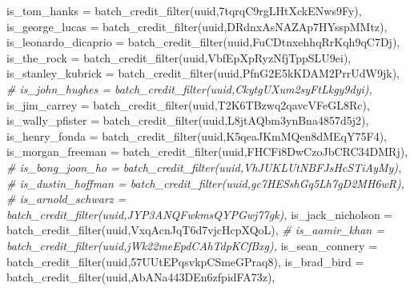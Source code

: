 \documentclass[
]{article}
\newenvironment{Shaded}{\begin{snugshade}}{\end{snugshade}}
\newcommand{\AttributeTok}[1]{\textcolor[rgb]{0.77,0.63,0.00}{#1}}
\newcommand{\CommentTok}[1]{\textcolor[rgb]{0.56,0.35,0.01}{\textit{#1}}}
\newcommand{\FunctionTok}[1]{\textcolor[rgb]{0.00,0.00,0.00}{#1}}
\newcommand{\NormalTok}[1]{#1}
\newcommand{\StringTok}[1]{\textcolor[rgb]{0.31,0.60,0.02}{#1}}
\begin{document}
\begin{Shaded}
\begin{Highlighting}[]
    \AttributeTok{is\_tom\_hanks =} \FunctionTok{batch\_credit\_filter}\NormalTok{(uuid,}\StringTok{\textquotesingle{}7tqrqC9rgLHtXckENws9Fy\textquotesingle{}}\NormalTok{),}
    \AttributeTok{is\_george\_lucas =} \FunctionTok{batch\_credit\_filter}\NormalTok{(uuid,}\StringTok{\textquotesingle{}DRdnxAsNAZAp7HYsspMMtz\textquotesingle{}}\NormalTok{),}
    \AttributeTok{is\_leonardo\_dicaprio =} \FunctionTok{batch\_credit\_filter}\NormalTok{(uuid,}\StringTok{\textquotesingle{}FuCDtnxehhqRrKqh9qC7Dj\textquotesingle{}}\NormalTok{),}
    \AttributeTok{is\_the\_rock =} \FunctionTok{batch\_credit\_filter}\NormalTok{(uuid,}\StringTok{\textquotesingle{}VbfEpXpRyzNfjTppSLU9ei\textquotesingle{}}\NormalTok{),}
    \AttributeTok{is\_stanley\_kubrick =} \FunctionTok{batch\_credit\_filter}\NormalTok{(uuid,}\StringTok{\textquotesingle{}PfnG2E5kKDAM2PrrUdW9jk\textquotesingle{}}\NormalTok{),}
    \CommentTok{\# is\_john\_hughes = batch\_credit\_filter(uuid,\textquotesingle{}CkytgUXum2syFtLkgy9dyi\textquotesingle{}),}
    \AttributeTok{is\_jim\_carrey =} \FunctionTok{batch\_credit\_filter}\NormalTok{(uuid,}\StringTok{\textquotesingle{}T2K6TBzwq2qavcVFeGL8Rc\textquotesingle{}}\NormalTok{),}
    \AttributeTok{is\_wally\_pfister =} \FunctionTok{batch\_credit\_filter}\NormalTok{(uuid,}\StringTok{\textquotesingle{}L8jtAQbm3ynBna4857d5j2\textquotesingle{}}\NormalTok{),}
    \AttributeTok{is\_henry\_fonda =} \FunctionTok{batch\_credit\_filter}\NormalTok{(uuid,}\StringTok{\textquotesingle{}K5qeaJKmMQen8dMEqY75F4\textquotesingle{}}\NormalTok{),}
    \AttributeTok{is\_morgan\_freeman =} \FunctionTok{batch\_credit\_filter}\NormalTok{(uuid,}\StringTok{\textquotesingle{}FHCFi8DwCzoJbCRC34DMRj\textquotesingle{}}\NormalTok{),}
    \CommentTok{\# is\_bong\_joon\_ho = batch\_credit\_filter(uuid,\textquotesingle{}VhJUKLUtNBFJsHcSTiAyMy\textquotesingle{}),}
    \CommentTok{\# is\_dustin\_hoffman = batch\_credit\_filter(uuid,\textquotesingle{}gc7HESshGq5Lh7gD2MH6wR\textquotesingle{}),}
    \CommentTok{\# is\_arnold\_schwarz = batch\_credit\_filter(uuid,\textquotesingle{}JYP3ANQFwkmsQYPGwj77gk\textquotesingle{}),}
    \AttributeTok{is\_jack\_nicholson =} \FunctionTok{batch\_credit\_filter}\NormalTok{(uuid,}\StringTok{\textquotesingle{}VxqAcnJqT6d7vjcHcpXQoL\textquotesingle{}}\NormalTok{),}
    \CommentTok{\# is\_aamir\_khan = batch\_credit\_filter(uuid,\textquotesingle{}jWk22meEpdCAhTdpKCfBxg\textquotesingle{}),}
    \AttributeTok{is\_sean\_connery =} \FunctionTok{batch\_credit\_filter}\NormalTok{(uuid,}\StringTok{\textquotesingle{}57UUtEPqsvkpCSmeGPraq8\textquotesingle{}}\NormalTok{),}
    \AttributeTok{is\_brad\_bird =} \FunctionTok{batch\_credit\_filter}\NormalTok{(uuid,}\StringTok{\textquotesingle{}AbANa443DEn6zfpidFA73z\textquotesingle{}}\NormalTok{),}

\end{Highlighting}
\end{Shaded}
\end{document}
